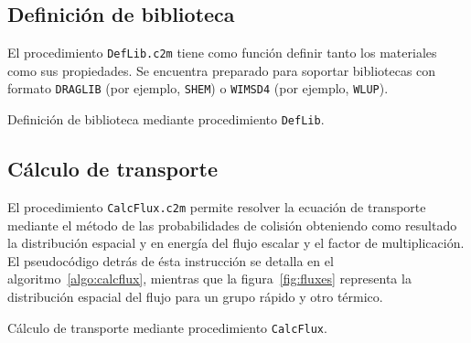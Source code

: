 \documentclass[11pt]{article}
\begin{document}
\subsection{Definición de biblioteca}

El procedimiento \texttt{DefLib.c2m} tiene como función definir tanto los materiales como sus propiedades. Se encuentra preparado para soportar bibliotecas con formato \texttt{DRAGLIB} (por ejemplo, \texttt{SHEM}) o \texttt{WIMSD4} (por ejemplo, \texttt{WLUP}). 

\medskip
\begin{algorithm}[H]
 
 
 \caption{Definición de biblioteca mediante procedimiento \texttt{DefLib}.\label{algo:deflib}}
\end{algorithm}
\medskip


\subsection{Cálculo de transporte}

El procedimiento \texttt{CalcFlux.c2m} permite resolver la ecuación de transporte mediante el método de las probabilidades de colisión obteniendo como resultado la distribución espacial y en energía del flujo escalar y el factor de multiplicación. El pseudocódigo detrás de ésta instrucción se detalla en el algoritmo~\ref{algo:calcflux}, mientras que la figura~\ref{fig:fluxes} representa la distribución espacial del flujo para un grupo rápido y otro térmico.

\medskip
\begin{algorithm}[H]
 
 
 \caption{Cálculo de transporte mediante procedimiento \texttt{CalcFlux}.\label{algo:calcflux}}
\end{algorithm}
\medskip
\end{document}
